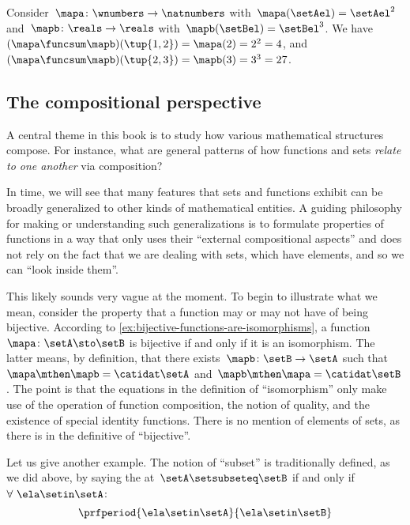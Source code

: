 \begin{example}
    Consider~$\mapa\colon \wnumbers \to \natnumbers$ with~$\mapa(\setAel)=\setAel^2$ and~$\mapb\colon \reals \to \reals$ with~$\mapb(\setBel)=\setBel^3$.
    We have~$(\mapa \funcsum \mapb)(\tup{1,2})=\mapa(2)=2^2=4$, and~$(\mapa \funcsum \mapb)(\tup{2,3})=\mapb(3)=3^3 = 27$.
\end{example}

\subsection{The compositional perspective}

A central theme in this book is to study how various mathematical structures compose.
For instance, what are general patterns of how functions and sets \emph{relate to one another} via composition?

In time, we will see that many features that sets and functions exhibit can be broadly generalized to other kinds of mathematical entities.
A guiding philosophy for making or understanding such generalizations is to formulate properties of functions in a way that only uses their ``external compositional aspects'' and does not rely on the fact that we are dealing with sets, which have elements, and so we can ``look inside them''.

This likely sounds very vague at the moment.
To begin to illustrate what we mean, consider the property that a function may or may not have of being bijective.
According to \cref{ex:bijective-functions-are-isomorphisms}, a function~$\mapa\colon \setA \sto \setB$ is bijective if and only if it is an isomorphism.
The latter means, by definition, that there exists~$\mapb \colon \setB \to \setA$ such that~$\mapa \mthen \mapb = \catidat\setA$ and~$\mapb \mthen \mapa = \catidat\setB$.
The point is that the equations in the definition of ``isomorphism'' only make use of the operation of function composition, the notion of quality, and the existence of special identity functions.
There is no mention of elements of sets, as there is in the definitive of ``bijective''.

Let us give another example.
The notion of ``subset'' is traditionally defined, as we did above, by saying the at~$\setA \setsubseteq \setB$ if and only if~$\forall \ \ela \setin\setA$:
\begin{equation}
    \prfperiod{
        \ela \setin\setA
    }{
        \ela \setin\setB
    }
\end{equation}

